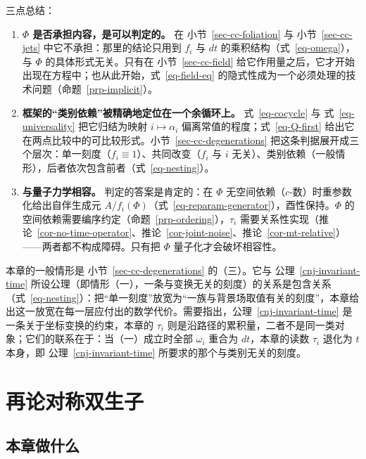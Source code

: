 \documentclass[
  chinese,
  a4paper,
  UTF8,
  12pt,
  oneside,
  openany]{ctexbook}
\providecommand{\tightlist}{%
  \setlength{\itemsep}{0pt}\setlength{\parskip}{0pt}}
\theoremstyle{plain}
\theoremstyle{plain}
\theoremstyle{plain}
\theoremstyle{definition}
\theoremstyle{plain}
\theoremstyle{plain}
\theoremstyle{remark}
\begin{document}
三点总结：

\begin{enumerate}
\def\labelenumi{\arabic{enumi}.}
\tightlist
\item
  \textbf{\(\Phi\) 是否承担内容，是可以判定的。} 在
  小节~\ref{sec-cc-foliation} 与 小节~\ref{sec-cc-jets}
  中它不承担：那里的结论只用到 \(f_i\) 与 \(dt\)
  的乘积结构（式~\ref{eq-omega}），与 \(\Phi\) 的具体形式无关。只有在
  小节~\ref{sec-cc-field}
  给它作用量之后，它才开始出现在方程中；也从此开始，式~\ref{eq-field-eq}
  的隐式性成为一个必须处理的技术问题（命题~\ref{prp-implicit}）。
\item
  \textbf{框架的``类别依赖''被精确地定位在一个余循环上。}
  式~\ref{eq-cocycle} 与 式~\ref{eq-universality} 把它归结为映射
  \(i\mapsto\alpha_i\) 偏离常值的程度；式~\ref{eq-Q-first}
  给出它在两点比较中的可比较形式。小节~\ref{sec-cc-degenerations}
  把这条判据展开成三个层次：单一刻度（\(f_i\equiv1\)）、共同改变（\(f_i\)
  与 \(i\)
  无关）、类别依赖（一般情形），后者依次包含前者（式~\ref{eq-nesting}）。
\item
  \textbf{与量子力学相容。} 判定的答案是肯定的：在 \(\Phi\)
  无空间依赖（\(c\)-数）时重参数化给出自伴生成元
  \(A/f_i(\Phi)\)（式~\ref{eq-reparam-generator}），酉性保持。\(\Phi\)
  的空间依赖需要编序约定（命题~\ref{prp-ordering}），\(\tau_i\)
  需要关系性实现（推论~\ref{cor-no-time-operator}、推论~\ref{cor-joint-noise}、推论~\ref{cor-mt-relative}）------两者都不构成障碍。只有把
  \(\Phi\) 量子化才会破坏相容性。
\end{enumerate}

本章的一般情形是 小节~\ref{sec-cc-degenerations} 的（三）。它与
公理~\ref{cnj-invariant-time}
所设公理（即情形（一），一条与变换无关的刻度）的关系是包含关系（式~\ref{eq-nesting}）：把``单一刻度''放宽为``一族与背景场取值有关的刻度''，本章给出这一放宽在每一层应付出的数学代价。需要指出，公理~\ref{cnj-invariant-time}
是一条关于坐标变换的约束，本章的 \(\tau_i\)
则是沿路径的累积量，二者不是同一类对象；它们的联系在于：当（一）成立时全部
\(\omega_i\) 重合为 \(dt\)，本章的读数 \(\tau_i\) 退化为 \(t\) 本身，即
公理~\ref{cnj-invariant-time} 所要求的那个与类别无关的刻度。


\chapter{再论对称双生子}\label{sec-twins-comparison}

\section{本章做什么}\label{sec-tc-scope}
\end{document}
